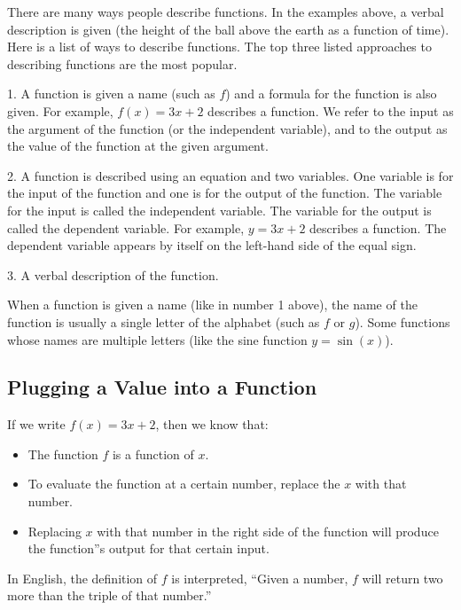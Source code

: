 There are many ways people describe functions. In the examples above, a verbal description
is given (the height of the ball above the earth as a function of time). Here is a list of
ways to describe functions. The top three listed approaches to describing functions are
the most popular.

1. A function is given a name (such as $f$) and a formula for the function is also given. For example, $f(x) = 3x + 2$ describes a function. We refer to the input as the argument of the function (or the independent variable), and to the output as the value of the function at the given argument.

2. A function is described using an equation and two variables. One variable is for the input of the function and one is for the output of the function. The variable for the input is called the independent variable. The variable for the output is called the dependent variable. For example, $y = 3x + 2$ describes a function. The dependent variable appears by itself on the left-hand side of the equal sign.

3. A verbal description of the function.

When a function is given a name (like in number 1 above), the name of the function is usually a single letter of the alphabet (such as $f$ or $g$). Some functions whose names are multiple letters (like the sine function $y = \sin(x)$).

\subsection{Plugging a Value into a Function}
\label{sss:plug-50c6}

If we write $f(x) = 3x + 2$, then we know that:

\begin{itemize}
    \item The function $f$ is a function of $x$.
    \item To evaluate the function at a certain number, replace the $x$ with that number.
    \item Replacing $x$ with that number in the right side of the function will produce the function''s output for that certain input.
\end{itemize}

In English, the definition of $f$ is interpreted, ``Given a number, $f$ will return two more than the triple of that number.''

